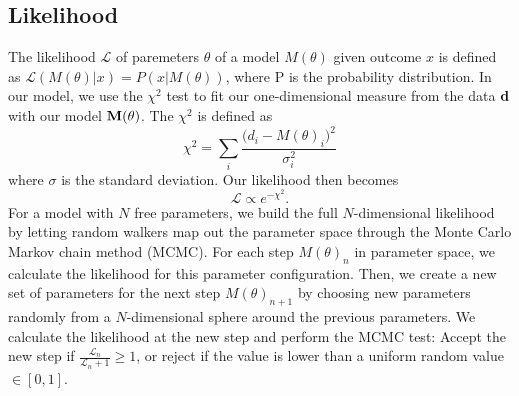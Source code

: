\documentclass[aps,pre,twocolumn,letterpaper,floatfix,showpacs]{revtex4}
\begin{document}



\subsection{Likelihood}
The likelihood $\mathcal{L}$ of paremeters $\theta$ of a model $M(\theta)$ given outcome $x$ is defined as $\mathcal{L} (M(\theta) | x) = P( x | M(\theta))$, where P is the probability distribution. In our model, we use the $\chi^2$ test to fit our one-dimensional measure from the data $\bf d$ with our model $\bf M(\theta)$. The $\chi^2$ is defined as 
\begin{equation}
  \chi^2 = \sum_i \frac{ \Big(d_i - M(\theta)_i \Big)^2}{\sigma_i^2}
\end{equation}    
where $\sigma$ is the standard deviation. Our likelihood then becomes
\begin{equation}
\mathcal L \propto e^{-\chi^2}.
\end{equation}
For a model with $N$ free parameters, we build the full $N$-dimensional likelihood by letting random walkers map out the parameter space through the Monte Carlo Markov chain method (MCMC). For each step $M(\theta)_n$ in parameter space, we calculate the likelihood for this parameter configuration. Then, we create a new set of parameters for the next step $M(\theta)_{n+1}$ by choosing new parameters randomly from a $N$-dimensional sphere around the previous parameters. We calculate the likelihood at the new step and perform the MCMC test: Accept the new step if $\frac{\mathcal L_n}{\mathcal L_n+1} \ge 1$, or reject if the value is lower than a uniform random value $\in [0,1]$.  
\end{document}
